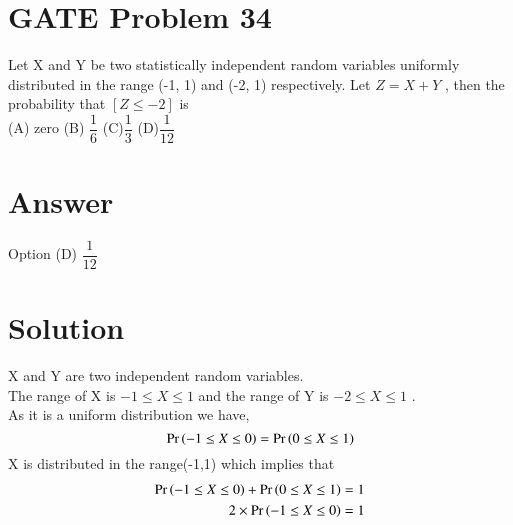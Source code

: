 \documentclass[journal,12pt,twocolumn]{IEEEtran}
\begin{document}
\section*{GATE Problem 34}
Let X and Y be two statistically independent random variables uniformly distributed in the range (-1, 1) and (-2, 1) respectively. Let $Z = X +Y$ , then the probability that $[Z \leq -2]$ is \\
(A) zero         \hfill  (B) $\dfrac{1}{6}$  \hfill
(C)$\dfrac{1}{3}$      \hfill       (D)$\dfrac{1}{12}$  
\section*{Answer}
Option (D) $\dfrac{1}{12}$
\section*{Solution}
X and Y are two independent random variables. \\
The range of X is $-1 \leq X \leq 1$ and the range of Y is $-2 \leq X \leq 1$ .\\ 
As it is a uniform distribution we have, 
\begin{equation}
    \Pr\left(-1 \leq X \leq 0\right) = \Pr\left(0 \leq X \leq 1\right)
\end{equation}
X is distributed in the range(-1,1) which implies that
\begin{align}
    \Pr\left(-1 \leq X \leq 0\right) + \Pr\left(0 \leq X \leq 1\right)= 1 \\
 2 \times \Pr\left(-1 \leq X \leq 0\right) = 1
\end{align}
\end{document}
